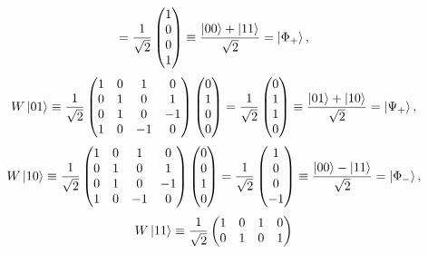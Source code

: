 \documentclass{scrartcl}
\newcommand{\inv}[1]{\frac{1}{#1}}
\DeclareRobustCommand{\[}{\begin{equation}}
\DeclareRobustCommand{\]}{\end{equation}}
\begin{document}
\begin{enumerate}
\[        = \inv{\sqrt{2}}
        \begin{pmatrix} 1 \\ 0 \\ 0 \\ 1 \end{pmatrix}
        \equiv \frac{\ket{00} + \ket{11}}{\sqrt{2}} = \ket{\Phi_+},
    \]
    \[
        W \ket{01} \equiv
        \inv{\sqrt{2}}
        \begin{pmatrix}
            1 & 0 & 1 & 0 \\
            0 & 1 & 0 & 1 \\
            0 & 1 & 0 & -1 \\
            1 & 0 & -1 & 0
        \end{pmatrix}
        \begin{pmatrix} 0 \\ 1 \\ 0 \\ 0 \end{pmatrix}
        = \inv{\sqrt{2}}
        \begin{pmatrix} 0 \\ 1 \\ 1 \\ 0 \end{pmatrix}
        \equiv \frac{\ket{01} + \ket{10}}{\sqrt{2}} = \ket{\Psi_+},
    \]
    \[
        W \ket{10} \equiv
        \inv{\sqrt{2}}
        \begin{pmatrix}
            1 & 0 & 1 & 0 \\
            0 & 1 & 0 & 1 \\
            0 & 1 & 0 & -1 \\
            1 & 0 & -1 & 0
        \end{pmatrix}
        \begin{pmatrix} 0 \\ 0 \\ 1 \\ 0 \end{pmatrix}
        = \inv{\sqrt{2}}
        \begin{pmatrix} 1 \\ 0 \\ 0 \\ -1 \end{pmatrix}
        \equiv \frac{\ket{00} - \ket{11}}{\sqrt{2}} = \ket{\Phi_-},
    \]
    \[
        W \ket{11} \equiv
        \inv{\sqrt{2}}
        \begin{pmatrix}
            1 & 0 & 1 & 0 \\
            0 & 1 & 0 & 1 \\

\end{pmatrix}\]
\end{enumerate}
\end{document}
